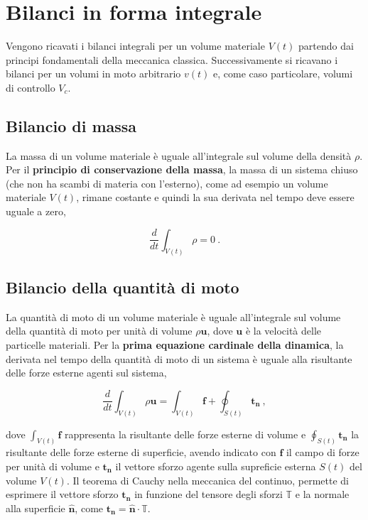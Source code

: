 \section{Bilanci in forma integrale}

Vengono ricavati i bilanci integrali per un volume materiale $V(t)$ partendo dai principi fondamentali della meccanica classica. Successivamente si ricavano i bilanci per un volumi in moto arbitrario $v(t)$ e, come caso particolare, volumi di controllo $V_c$.

\subsection{Bilancio di massa}
La massa di un volume materiale è uguale all'integrale sul volume della densità $\rho$. Per il \textbf{principio di conservazione della massa}, la massa di un sistema chiuso (che non ha scambi di materia con l'esterno), come ad esempio un volume materiale $V(t)$, rimane costante e quindi la sua derivata nel tempo deve essere uguale a zero,
\begin{fBox}
\begin{equation}
 \dfrac{d}{dt} \int_{V(t)} \rho = 0 \ .
\end{equation}
\end{fBox}

\subsection{Bilancio della quantità di moto}
La quantità di moto di un volume materiale è uguale all'integrale sul volume della quantità di moto per unità di volume $\rho \bm{u}$, dove $\bm{u}$ è la velocità delle particelle materiali.
Per la \textbf{prima equazione cardinale della dinamica}, la derivata nel tempo della quantità di moto di un sistema è uguale alla risultante delle forze esterne agenti sul sistema,
\begin{fBox}
\begin{equation}
 \dfrac{d}{dt} \int_{V(t)} \rho \bm{u} = \int_{V(t)} \bm{f} + \oint_{S(t)} \bm{t_n} \ , 
\end{equation}
\end{fBox}
dove $\int_{V(t)} \bm{f}$ rappresenta la risultante delle forze esterne di volume e $\oint_{S(t)} \bm{t_n}$ la risultante delle forze esterne di superficie, avendo indicato con $\bm{f}$ il campo di forze per unità di volume e $\bm{t_n}$ il vettore sforzo agente sulla supreficie esterna $S(t)$ del volume $V(t)$. Il teorema di Cauchy nella meccanica del continuo, permette di esprimere il vettore sforzo $\bm{t_n}$ in funzione del tensore degli sforzi $\mathbb{T}$ e la normale alla superficie $\bm{\hat{n}}$, come $\bm{t_n} = \bm{\hat{n}} \cdot \mathbb{T}$.

